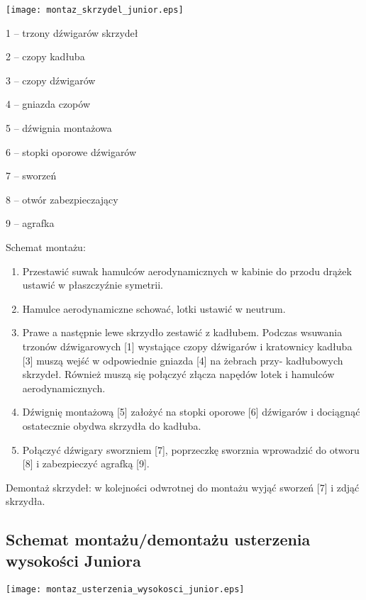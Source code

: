 \documentclass{article}
\newenvironment{packed_enum}{
\begin{enumerate}
  \setlength{\itemsep}{1pt}
  \setlength{\parskip}{0pt}
  \setlength{\parsep}{0pt}
}{\end{enumerate}}
\begin{document}
\begin{center}
\texttt{[image: montaz\_skrzydel\_junior.eps]}
\end{center}

\begin{packed_enum}
\item[1] -- trzony dźwigarów skrzydeł
\item[2] -- czopy kadłuba
\item[3] -- czopy dźwigarów
\item[4] -- gniazda czopów
\item[5] -- dźwignia montażowa
\item[6] -- stopki oporowe dźwigarów
\item[7] -- sworzeń
\item[8] -- otwór zabezpieczający
\item[9] -- agrafka
\end{packed_enum}

\noindent
Schemat montażu:
\begin{enumerate}
\item Przestawić suwak hamulców aerodynamicznych w kabinie do przodu
   drążek ustawić w płaszczyźnie symetrii.
\item Hamulce aerodynamiczne schować, lotki ustawić w neutrum.
\item Prawe a następnie lewe skrzydło zestawić z kadłubem. Podczas wsuwania
   trzonów dźwigarowych [1] wystające czopy dźwigarów i kratownicy
   kadłuba [3] muszą wejść w odpowiednie gniazda [4] na żebrach przy-
   kadłubowych skrzydeł. Również muszą się połączyć złącza napędów lotek
   i hamulców aerodynamicznych.
\item Dźwignię montażową [5] założyć na stopki oporowe [6] dźwigarów i
   dociągnąć ostatecznie obydwa skrzydła do kadłuba.
\item Połączyć dźwigary sworzniem [7], poprzeczkę sworznia wprowadzić do
   otworu [8] i zabezpieczyć agrafką [9].
\end{enumerate}

\noindent
Demontaż skrzydeł: w kolejności odwrotnej do montażu wyjąć
sworzeń [7] i zdjąć skrzydła.

\newpage
\subsection{Schemat montażu/demontażu usterzenia wysokości Juniora}

\begin{center}
\texttt{[image: montaz\_usterzenia\_wysokosci\_junior.eps]}
\end{center}
\end{document}
